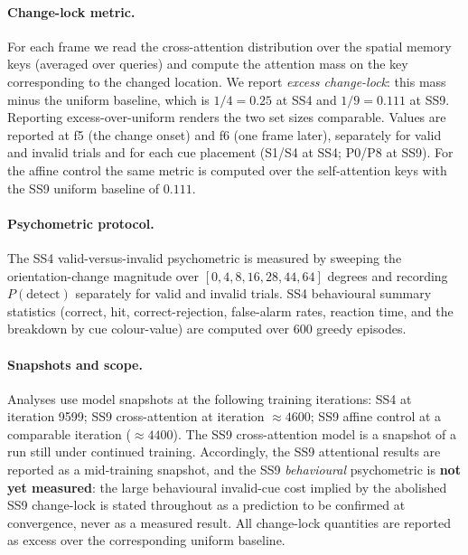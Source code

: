 \paragraph{Change-lock metric.} For each frame we read the cross-attention distribution over the spatial memory keys (averaged over queries) and compute the attention mass on the key corresponding to the changed location. We report \emph{excess change-lock}: this mass minus the uniform baseline, which is $1/4=0.25$ at SS4 and $1/9=0.111$ at SS9. Reporting excess-over-uniform renders the two set sizes comparable. Values are reported at f5 (the change onset) and f6 (one frame later), separately for valid and invalid trials and for each cue placement (S1/S4 at SS4; P0/P8 at SS9). For the affine control the same metric is computed over the self-attention keys with the SS9 uniform baseline of $0.111$.

\paragraph{Psychometric protocol.} The SS4 valid-versus-invalid psychometric is measured by sweeping the orientation-change magnitude over $[0,4,8,16,28,44,64]$ degrees and recording $P(\text{detect})$ separately for valid and invalid trials. SS4 behavioural summary statistics (correct, hit, correct-rejection, false-alarm rates, reaction time, and the breakdown by cue colour-value) are computed over 600 greedy episodes.

\paragraph{Snapshots and scope.} Analyses use model snapshots at the following training iterations: SS4 at iteration 9599; SS9 cross-attention at iteration ${\approx}4600$; SS9 affine control at a comparable iteration (${\approx}4400$). The SS9 cross-attention model is a snapshot of a run still under continued training. Accordingly, the SS9 attentional results are reported as a mid-training snapshot, and the SS9 \emph{behavioural} psychometric is \textbf{not yet measured}: the large behavioural invalid-cue cost implied by the abolished SS9 change-lock is stated throughout as a prediction to be confirmed at convergence, never as a measured result. All change-lock quantities are reported as excess over the corresponding uniform baseline.

